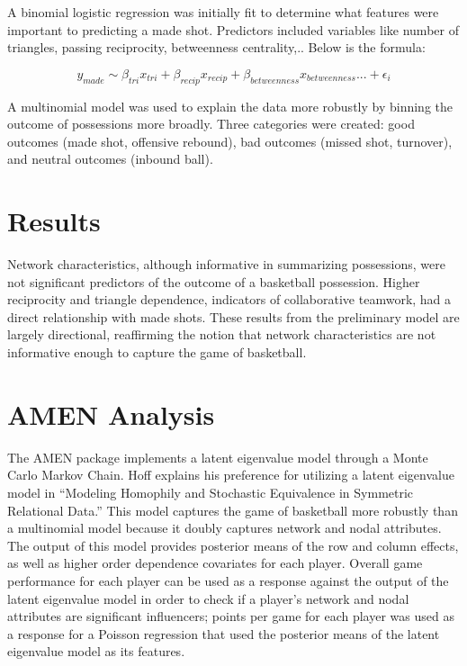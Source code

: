 \documentclass[12pt,twoside]{dukestatscithesis}
\theoremstyle{definition}
\theoremstyle{definition}
\theoremstyle{definition}
\theoremstyle{remark}
\begin{document}
A binomial logistic regression was initially fit to determine what
features were important to predicting a made shot. Predictors included
variables like number of triangles, passing reciprocity, betweenness
centrality,.. Below is the formula:

\[y_{made} \sim \beta_{tri}x_{tri} + \beta_{recip}x_{recip} + \beta_{betweenness}x_{betweenness}... + \epsilon_{i}\]

A multinomial model was used to explain the data more robustly by
binning the outcome of possessions more broadly. Three categories were
created: good outcomes (made shot, offensive rebound), bad outcomes
(missed shot, turnover), and neutral outcomes (inbound ball).

\section{Results}\label{results}

Network characteristics, although informative in summarizing
possessions, were not significant predictors of the outcome of a
basketball possession. Higher reciprocity and triangle dependence,
indicators of collaborative teamwork, had a direct relationship with
made shots. These results from the preliminary model are largely
directional, reaffirming the notion that network characteristics are not
informative enough to capture the game of basketball.

\section{AMEN Analysis}\label{amen-analysis}

The AMEN package implements a latent eigenvalue model through a Monte
Carlo Markov Chain. Hoff explains his preference for utilizing a latent
eigenvalue model in ``Modeling Homophily and Stochastic Equivalence in
Symmetric Relational Data.'' This model captures the game of basketball
more robustly than a multinomial model because it doubly captures
network and nodal attributes. The output of this model provides
posterior means of the row and column effects, as well as higher order
dependence covariates for each player. Overall game performance for each
player can be used as a response against the output of the latent
eigenvalue model in order to check if a player's network and nodal
attributes are significant influencers; points per game for each player
was used as a response for a Poisson regression that used the posterior
means of the latent eigenvalue model as its features.
\end{document}
